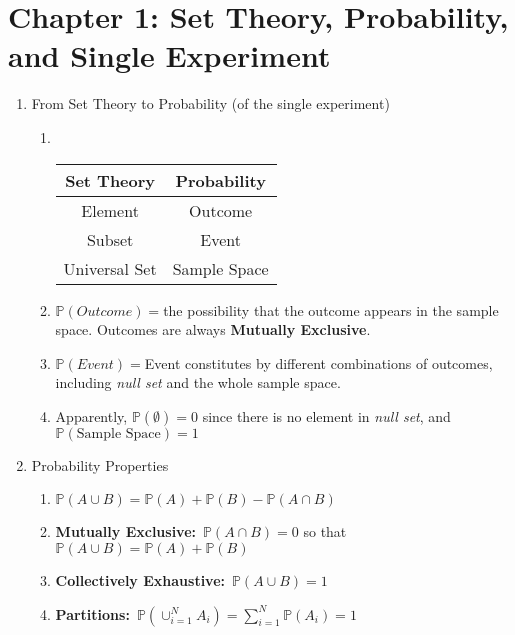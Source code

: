 \section*{Chapter 1: Set Theory, Probability, and Single Experiment}
\begin{enumerate}
    \item From Set Theory to Probability (of the single experiment)
    \begin{enumerate}
        \item~{
            \begin{center}
                \begin{tabular}{|c|c|}
                    \hline
                    \textbf{Set Theory} & \textbf{Probability} \\
                    \hline
                    \hline
                    Element & Outcome \\
                    \hline
                    Subset  & Event   \\
                    \hline
                    Universal Set & Sample Space \\
                    \hline
                \end{tabular}
            \end{center}
                        }
            \item $\mathbb{P}(Outcome)=$the possibility that the outcome appears in the sample space. Outcomes are always \textbf{Mutually Exclusive}.
            \item $\mathbb{P}(Event)=$Event constitutes by different combinations of outcomes, including \textit{null set} and the whole sample space.
            \item Apparently, $\mathbb{P}(\emptyset)=0$ since there is no element in \textit{null set}, and $\mathbb{P}(\text{Sample Space})=1$
    \end{enumerate}
    \item Probability Properties
    \begin{enumerate}
        \item $\mathbb{P}(A \cup B) = \mathbb{P}(A)+\mathbb{P}(B)-\mathbb{P}(A\cap B)$
        \item \textbf{Mutually Exclusive:}~$\mathbb{P}(A \cap B)=0$ so that $\mathbb{P}(A \cup B) = \mathbb{P}(A)+\mathbb{P}(B)$
        \item \textbf{Collectively Exhaustive:}~$\mathbb{P}(A\cup B)=1$
        \item \textbf{Partitions:}~$\mathbb{P}(\cup_{i=1}^N A_i)=\sum_{i=1}^{N}\mathbb{P}(A_i)=1$

\end{enumerate}
\end{enumerate}
